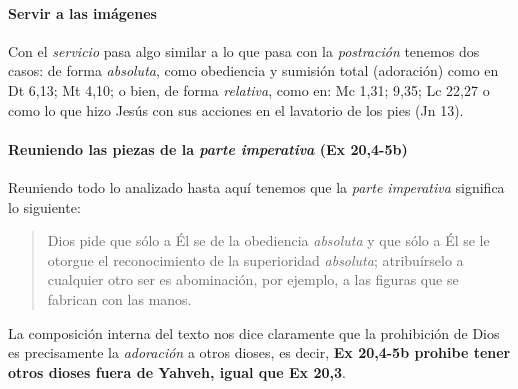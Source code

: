 \documentclass{article}
\begin{document}


\paragraph{Servir a las im\'agenes}

Con el \emph{servicio} pasa algo similar a lo que pasa con la \emph{postraci\'on} tenemos dos casos: de forma \emph{absoluta}, como obediencia y sumisi\'on total (adoraci\'on) como en  Dt 6,13; Mt 4,10; o bien, de forma \emph{relativa}, como en: Mc 1,31; 9,35; Lc 22,27 o como lo que hizo Jes\'us con sus acciones en el lavatorio de los pies (Jn 13).

\paragraph{Reuniendo las piezas de la \emph{parte imperativa} (Ex 20,4-5b)}

Reuniendo todo lo analizado hasta aqu\'{i} tenemos que la \emph{parte imperativa} significa lo siguiente:

\begin{quote}
Dios pide que s\'olo a \'El se de la obediencia \emph{absoluta} y que s\'olo a \'El se le otorgue el reconocimiento de la superioridad \emph{absoluta}; atribu\'{i}rselo a cualquier otro ser es abominaci\'on, por ejemplo, a las figuras que se fabrican con las manos. 
\end{quote}

\noindent
La composici\'on interna del texto nos dice claramente que la prohibici\'on de Dios es precisamente la \emph{adoraci\'on} a otros dioses, es decir, \textbf{Ex 20,4-5b prohibe tener otros dioses fuera de Yahveh, igual que Ex 20,3}.
\end{document}
